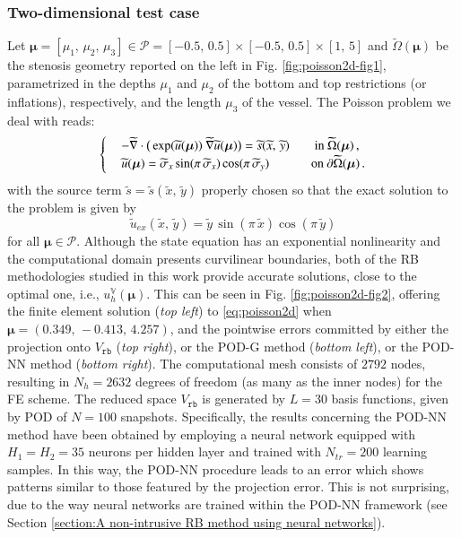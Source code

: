 \documentclass[longtitle]{elsarticle}
\numberwithin{equation}{section}
\theoremstyle{theorem}
\theoremstyle{definition}
\theoremstyle{remark}
\theoremstyle{proposition}
\numberwithin{figure}{section}
\newcommand{\wt}[1]{\widetilde{#1}}
\newcommand{\bg}[1]{\boldsymbol{#1}}
\begin{document}
		
	
	\subsubsection{Two-dimensional test case}
	\label{section:Two-dimensional test case}
		

		
		Let $\bg{\mu} = [\mu_1, \, \mu_2, \, \mu_3] \in \mathcal{P} = [-0.5, \, 0.5] \times [-0.5, \, 0.5] \times [1, \, 5]$ and $\wt{\Omega}(\bg{\mu})$ be the stenosis geometry reported on the left in Fig. \ref{fig:poisson2d-fig1}, parametrized in the depths $\mu_1$ and $\mu_2$ of the bottom and top restrictions (or inflations), respectively, and the length $\mu_3$ of the vessel. The Poisson problem we deal with reads:
		\begin{equation}
			\label{eq:poisson2d}
			\begin{cases}
				& - \wt{\nabla} \cdot \big( \exp(\wt{u}(\bg{\mu})) ~ \wt{\nabla} \wt{u}(\bg{\mu}) \big) = \wt{s}(\wt{x}, \, \wt{y}) \hspace*{20pt} \text{in $\wt{\Omega}(\bg{\mu})$} \, , \\
				& \wt{u}(\bg{\mu}) = \wt{\sigma}_x \sin(\pi \, \wt{\sigma}_x) \cos(\pi \, \wt{\sigma}_y) \hspace*{33.5pt} \text{on $\partial \wt{\Omega}(\bg{\mu})$} \, .
			\end{cases}
		\end{equation}
		with the source term $\wt{s} = \wt{s}(\wt{x}, \, \wt{y})$ properly chosen so that the exact solution to the problem is given by \[ \wt{u}_{ex}(\wt{x}, \, \wt{y}) = \wt{y} \, \sin(\pi \, \wt{x}) \cos(\pi \, \wt{y}) \] for all $\bg{\mu} \in \mathcal{P}$. Although the state equation has an exponential nonlinearity and the computational domain presents curvilinear boundaries, both of the RB methodologies studied in this work provide accurate solutions, close to the optimal one, i.e., $u_h^{\mathbb{V}}(\bg{\mu})$.	This can be seen in Fig. \ref{fig:poisson2d-fig2}, offering the finite element solution (\emph{top left}) to \eqref{eq:poisson2d} when $\bg{\mu} = (0.349, \, -0.413, \, 4.257)$, and the pointwise errors committed by either the projection onto $V_{\texttt{rb}}$ (\emph{top right}), or the POD-G method (\emph{bottom left}), or the POD-NN method (\emph{bottom right}). The computational mesh consists of $2792$ nodes, resulting in $N_h = 2632$ degrees of freedom (as many as the inner nodes) for the FE scheme. The reduced space $V_{\texttt{rb}}$ is generated by $L = 30$ basis functions, given by POD of $N = 100$ snapshots. Specifically, the results concerning the POD-NN method have been obtained by employing a neural network equipped with $H_1 = H_2 = 35$ neurons per hidden layer and trained with $N_{tr} = 200$ learning samples. In this way, the POD-NN procedure leads to an error which shows patterns similar to those featured by the projection error. This is not surprising, due to the way neural networks are trained within the POD-NN framework (see Section \ref{section:A non-intrusive RB method using neural networks}). 
		
\end{document}
